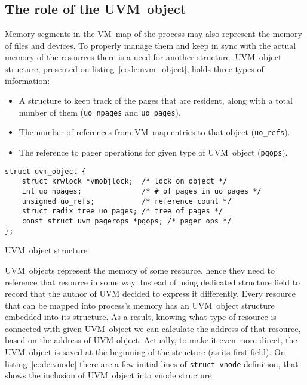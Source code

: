 \begin{samepage}
\section{The role of the UVM~object}

Memory segments in the VM~map of the process may also represent the memory of files and devices.
To properly manage them and keep in sync with the actual memory of the resources there is a need for another structure.
  UVM~object structure, presented on listing~\ref{code:uvm_object}, holds three types of information:

\begin{itemize}
  \item A structure to keep track of the pages that are resident, along with a total number of them (\texttt{uo_npages} and \texttt{uo_pages}).
  \item The number of references from VM~map entries to that object (\texttt{uo_refs}).
  \item The reference to pager operations for given type of UVM~object (\texttt{pgops}).
\end{itemize}

\end{samepage}

\begin{listing}[h]
  \begin{verbatim}
struct uvm_object {
    struct krwlock *vmobjlock;  /* lock on object */
    int uo_npages;              /* # of pages in uo_pages */
    unsigned uo_refs;           /* reference count */
    struct radix_tree uo_pages; /* tree of pages */
    const struct uvm_pagerops *pgops; /* pager ops */
};
  \end{verbatim}
  \caption{UVM~object structure}
  \label{code:uvm_object}
\end{listing}

UVM~objects represent the memory of some resource, hence they need to reference that resource in some way.
Instead of using dedicated structure field to record that the author of UVM decided to express it differently.
Every resource that can be mapped into process's memory has an UVM~object structure embedded into its structure.
As a result, knowing what type of resource is connected with given UVM~object we can calculate the address of that resource, based on the address of UVM object.
Actually, to make it even more direct, the UVM~object is saved at the beginning of the structure (as its first field).
On listing~\ref{code:vnode} there are a few initial lines of \texttt{struct vnode} definition, that shows the inclusion of UVM~object into vnode structure.

